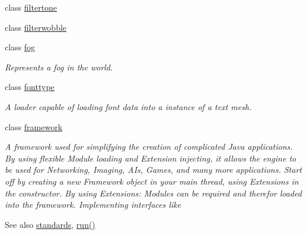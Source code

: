 \begin{DoxyCompactItemize}
\item 
class \hyperlink{classflounder_1_1filtertone}{filtertone}
\item 
class \hyperlink{classflounder_1_1filterwobble}{filterwobble}
\item 
class \hyperlink{classflounder_1_1fog}{fog}
\begin{DoxyCompactList}\small\item\em Represents a fog in the world. \end{DoxyCompactList}\item 
class \hyperlink{classflounder_1_1fonttype}{fonttype}
\begin{DoxyCompactList}\small\item\em A loader capable of loading font data into a instance of a text mesh. \end{DoxyCompactList}\item 
class \hyperlink{classflounder_1_1framework}{framework}
\begin{DoxyCompactList}\small\item\em A framework used for simplifying the creation of complicated Java applications. By using flexible Module loading and Extension injecting, it allows the engine to be used for Networking, Imaging, A\+Is, Games, and many more applications. Start off by creating a new Framework object in your main thread, using Extensions in the constructor. By using Extensions\+: Modules can be required and therefor loaded into the framework. Implementing interfaces like \begin{DoxySeeAlso}{See also}
\hyperlink{classflounder_1_1standards}{standards}, \hyperlink{classflounder_1_1framework_aa3a73c8e8f5f0c6ccef3e4de89982434}{run()}



\end{DoxySeeAlso}
\end{DoxyCompactList}
\end{DoxyCompactItemize}
